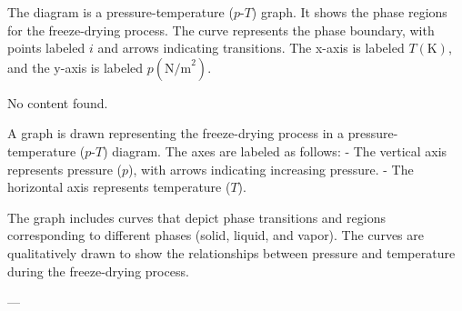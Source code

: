 The diagram is a pressure-temperature (\( p \)-\( T \)) graph. It shows the phase regions for the freeze-drying process. The curve represents the phase boundary, with points labeled \( i \) and arrows indicating transitions. The x-axis is labeled \( T(\text{K}) \), and the y-axis is labeled \( p(\text{N/m}^2) \).

No content found.

A graph is drawn representing the freeze-drying process in a pressure-temperature (\(p\)-\(T\)) diagram. The axes are labeled as follows:  
- The vertical axis represents pressure (\(p\)), with arrows indicating increasing pressure.  
- The horizontal axis represents temperature (\(T\)).  

The graph includes curves that depict phase transitions and regions corresponding to different phases (solid, liquid, and vapor). The curves are qualitatively drawn to show the relationships between pressure and temperature during the freeze-drying process.

---